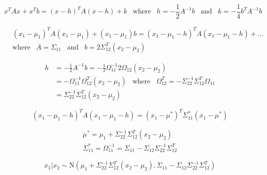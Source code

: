 \documentclass[12pt]{article}
\begin{document}
        \begin{equation}
            x^T A x + x^Tb = (x-h)^T A (x-h) + k \hspace{10pt} \text{where} \hspace{10pt} h = -\frac{1}{2}A^{-1}b \hspace{10pt} \text{and} \hspace{10pt} k = -\frac{1}{4}b^T A^{-1} b
        \end{equation}

        \begin{align}
            & (x_1 - \mu_1)^T A (x_1 - \mu_1) + (x_1 - \mu_1) b = (x_1 - \mu_1 - h)^T A (x_1 - \mu_1 - h) + ... \\
            & \text{where} \hspace{10pt} A = \Sigma_{11} \hspace{10pt} \text{and} \hspace{10pt} b = 2 \Sigma_{12}^T (x_2 - \mu_2)
        \end{align}

        \begin{align}
            h &= -\frac{1}{2}A^{-1}b = -\frac{1}{2}\Omega_{11}^{-1}2 \Omega_{12} (x_2 - \mu_2) \\
            & = -\Omega_{11}^{-1}\Omega_{12}^T (x_2 - \mu_2) \hspace{10pt} \text{where} \hspace{10pt} \Omega_{12}^T = -\Sigma_{22}^{-1} \Sigma_{12}^T \Omega_{11} \\
            & = \Sigma_{22}^{-1} \Sigma_{12}^T (x_2 - \mu_2)
        \end{align}

        \begin{equation}
            (x_1 - \mu_1 - h)^T A (x_1 - \mu_1 - h) = (x_1 - \mu^*)^T \Sigma_{11}^* (x_1 - \mu^*)
        \end{equation}

        \begin{align}
            \mu^* = \mu_1 + \Sigma_{22}^{-1} \Sigma_{12}^T(x_2 - \mu_2) \\
            \Sigma_{11}^* = \Omega_{11}^{-1} = \Sigma_{11} - \Sigma_{12} \Sigma_{22}^{-1} \Sigma_{12}^T
        \end{align}

        \begin{equation}
            x_1 | x_2 \sim \text{N}(\mu_1 + \Sigma_{22}^{-1} \Sigma_{12}^T(x_2 - \mu_2), \Sigma_{11} - \Sigma_{12} \Sigma_{22}^{-1}\Sigma_{12}^T)
        \end{equation}
\end{document}
